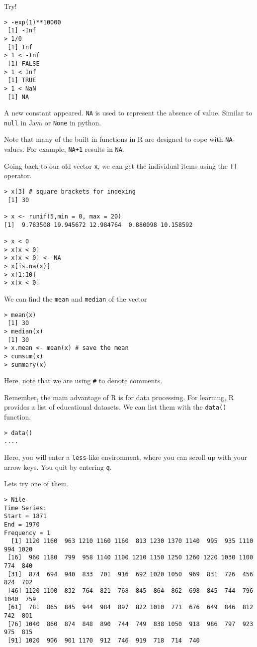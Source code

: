 \documentclass{article}[11pt]
\begin{document}
Try!

\begin{verbatim}
> -exp(1)**10000
 [1] -Inf
> 1/0
 [1] Inf
> 1 < -Inf
 [1] FALSE
> 1 < Inf
 [1] TRUE
> 1 < NaN
 [1] NA
\end{verbatim}

A new constant appeared. \texttt{NA} is used to represent the absence
of value. Similar to \texttt{null} in Java or \texttt{None} in python.

Note that many of the built in functions in R are designed to cope
with \texttt{NA}-values. For example, \texttt{NA+1} results in
\texttt{NA}.


Going back to our old vector \texttt{x}, we can get the individual
items using the \texttt{[]} operator.

\begin{verbatim}
> x[3] # square brackets for indexing
 [1] 30

> x <- runif(5,min = 0, max = 20)
[1]  9.783508 19.945672 12.984764  0.880098 10.158592

> x < 0
> x[x < 0]
> x[x < 0] <- NA
> x[is.na(x)]
> x[1:10]
> x[x < 0]
\end{verbatim}

We can find the \texttt{mean} and \texttt{median} of the vector

\begin{verbatim}
> mean(x)
 [1] 30
> median(x)
 [1] 30
> x.mean <- mean(x) # save the mean
> cumsum(x)
> summary(x)
\end{verbatim}

Here, note that we are using \texttt{\#} to denote comments.

Remember, the main advantage of R is for data processing. For
learning, R provides a list of educational datasets. We can list them
with the \texttt{data()} function.

\begin{verbatim}
> data()
....
\end{verbatim}

Here, you will enter a \texttt{less}-like environment, where you can
scroll up with your arrow keys. You quit by entering \texttt{q}.

Lets try one of them.

\begin{verbatim}
> Nile
Time Series:
Start = 1871 
End = 1970 
Frequency = 1 
  [1] 1120 1160  963 1210 1160 1160  813 1230 1370 1140  995  935 1110  994 1020
 [16]  960 1180  799  958 1140 1100 1210 1150 1250 1260 1220 1030 1100  774  840
 [31]  874  694  940  833  701  916  692 1020 1050  969  831  726  456  824  702
 [46] 1120 1100  832  764  821  768  845  864  862  698  845  744  796 1040  759
 [61]  781  865  845  944  984  897  822 1010  771  676  649  846  812  742  801
 [76] 1040  860  874  848  890  744  749  838 1050  918  986  797  923  975  815
 [91] 1020  906  901 1170  912  746  919  718  714  740
\end{verbatim}
\end{document}
